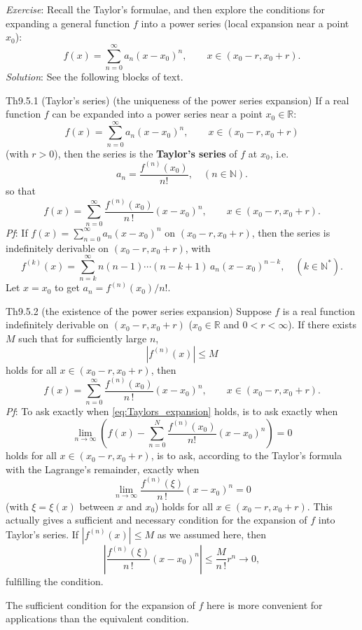 \documentclass{article}
\begin{document}
\begin{Rmk}{}
    \textit{Exercise}: Recall the Taylor's formulae, and then explore the conditions for expanding a general function $f$ into a power series (local expansion near a point $x_0$):
    $$ f(x) = \sum_{n=0}^{\infty} a_n (x - x_0)^n, \qquad x\in (x_0 - r, x_0 + r). $$
    \tcblower
    \textit{Solution}: See the following blocks of text.
\end{Rmk}

\begin{Th}{Th9.5.1 (Taylor's series) (the uniqueness of the power series expansion)}
    If a real function $f$ \textcolor{Df}{can be expanded into a power series near a point $x_0\in\mathbb{R}$:
    $$ f(x) = \sum_{n=0}^{\infty} a_n (x - x_0)^n, \qquad x\in (x_0 - r, x_0 + r) $$
    (with $r>0$),} then the series is the \textcolor{Df}{\textbf{Taylor's series} of $f$ at $x_0$, i.e.
    $$ a_n = \frac{f^{(n)}(x_0)}{n!}, \quad (n\in\mathbb{N}). $$} 
    so that
    $$ f(x) = \sum_{n=0}^{\infty} \frac{f^{(n)}(x_0)}{n\,!} (x - x_0)^n, \qquad x\in (x_0 - r, x_0 + r). $$
    \tcblower
    \textit{Pf}: If $f(x) = \sum_{n=0}^{\infty} a_n (x - x_0)^n$ on $(x_0 - r, x_0 + r)$, then the series is indefinitely derivable on $(x_0 - r, x_0 + r)$, with
    $$ f^{(k)}(x) = \sum_{n=k}^{\infty} n(n-1)\cdots(n-k+1)\, a_n (x - x_0)^{n-k}, \quad (k\in\mathbb{N}^\ast). $$
    Let $x = x_0$ to get $a_n = f^{(n)}(x_0)/n!$.
\end{Th}

\begin{Th}{Th9.5.2 (the existence of the power series expansion)}
    Suppose $f$ is a real function indefinitely derivable on $(x_0 - r, x_0 + r)$ ($x_0\in\mathbb{R}$ and $0<r<\infty$). If there exists $M$ such that for sufficiently large $n$,
    $$ |f^{(n)}(x)| \leq M $$
    holds for all $x\in (x_0 - r, x_0 + r)$, then
    \begin{equation}
        f(x) = \sum_{n=0}^{\infty} \frac{f^{(n)}(x_0)}{n\,!} (x - x_0)^n, \qquad x\in (x_0 - r, x_0 + r). 
        \label{eq:Taylors_expansion}
    \end{equation}
    \tcblower
    \textit{Pf}: To ask exactly when \eqref{eq:Taylors_expansion} holds, is to ask exactly when
    $$ \lim\limits_{n\to\infty} \left(f(x) - \sum_{n=0}^{N} \frac{f^{(n)}(x_0)}{n!} (x - x_0)^n \right) = 0 $$
    holds for all $x\in (x_0 - r, x_0 + r)$, is to ask, according to the Taylor's formula with the Lagrange's remainder, exactly when
    $$ \lim\limits_{n\to\infty} \frac{f^{(n)}(\xi)}{n\, !} (x - x_0)^n = 0 $$
    (with $\xi = \xi (x)$ between $x$ and $x_0$) holds for all $x\in (x_0 - r, x_0 + r)$.
    \textcolor{Th}{This actually gives a sufficient and necessary condition for the expansion of $f$ into Taylor's series.} If $|f^{(n)}(x)| \leq M$ as we assumed here, then
    $$ \left|\frac{f^{(n)}(\xi)}{n\, !} (x - x_0)^n\right| \leq \frac{M}{n\,!} r^n \to 0, $$
    fulfilling the condition.
\end{Th}

\begin{Rmk}{}
    The sufficient condition for the expansion of $f$ here is more convenient for applications than the equivalent condition.
\end{Rmk}
\end{document}
